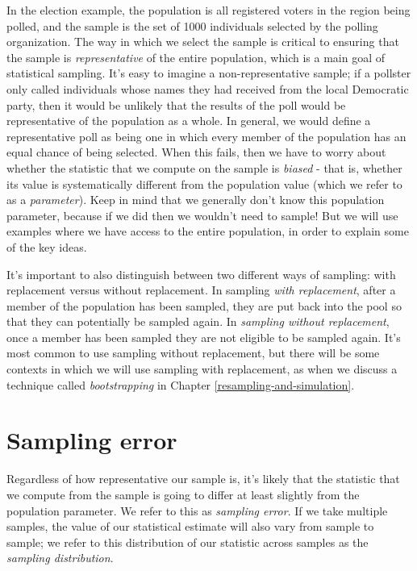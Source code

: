 \documentclass[12pt,]{book}
\theoremstyle{definition}
\theoremstyle{definition}
\theoremstyle{definition}
\theoremstyle{remark}
\begin{document}
In the election example, the population is all registered voters in the region being polled, and the sample is the set of 1000 individuals selected by the polling organization. The way in which we select the sample is critical to ensuring that the sample is \emph{representative} of the entire population, which is a main goal of statistical sampling. It's easy to imagine a non-representative sample; if a pollster only called individuals whose names they had received from the local Democratic party, then it would be unlikely that the results of the poll would be representative of the population as a whole. In general, we would define a representative poll as being one in which every member of the population has an equal chance of being selected. When this fails, then we have to worry about whether the statistic that we compute on the sample is \emph{biased} - that is, whether its value is systematically different from the population value (which we refer to as a \emph{parameter}). Keep in mind that we generally don't know this population parameter, because if we did then we wouldn't need to sample! But we will use examples where we have access to the entire population, in order to explain some of the key ideas.

It's important to also distinguish between two different ways of sampling: with replacement versus without replacement. In sampling \emph{with replacement}, after a member of the population has been sampled, they are put back into the pool so that they can potentially be sampled again. In \emph{sampling without replacement}, once a member has been sampled they are not eligible to be sampled again. It's most common to use sampling without replacement, but there will be some contexts in which we will use sampling with replacement, as when we discuss a technique called \emph{bootstrapping} in Chapter \ref{resampling-and-simulation}.

\hypertarget{samplingerror}{%
\section{Sampling error}\label{samplingerror}}

Regardless of how representative our sample is, it's likely that the statistic that we compute from the sample is going to differ at least slightly from the population parameter. We refer to this as \emph{sampling error}. If we take multiple samples, the value of our statistical estimate will also vary from sample to sample; we refer to this distribution of our statistic across samples as the \emph{sampling distribution}.
\end{document}
